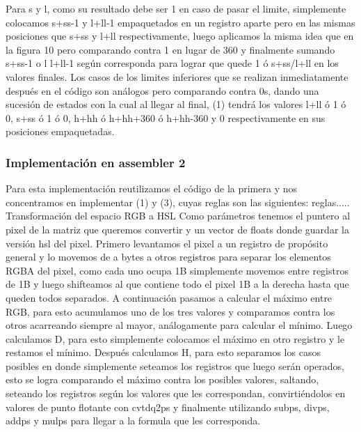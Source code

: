 \documentclass[a4paper]{article}
\begin{document}
Para s y l, como su resultado debe ser 1 en caso de pasar el limite, simplemente colocamos s+ss-1 y l+ll-1 empaquetados en un registro aparte pero en las mismas posiciones que s+ss y l+ll respectivamente, luego aplicamos la misma idea que en la figura 10 pero comparando contra 1 en lugar de 360 y finalmente sumando s+ss-1 o l l+ll-1 según corresponda para lograr que quede 1 ó s+ss/l+ll en los valores finales. Los casos de los limites inferiores que se realizan inmediatamente después en el código son análogos pero comparando contra 0s, dando una sucesión de estados con la cual al llegar al final, (1) tendrá los valores l+ll ó 1 ó 0, s+ss ó 1 ó 0,  h+hh ó h+hh+360 ó h+hh-360 y 0 respectivamente en sus posiciones empaquetadas.

\subsubsection{Implementación en assembler 2}
Para esta implementación reutilizamos el código de la primera y nos concentramos en implementar (1) y (3), cuyas reglas son las siguientes:
\newline\newline
reglas.....
\newline\newline
Transformación del espacio RGB a HSL
\newline\newline
Como parámetros tenemos el puntero al pixel de la matriz que queremos convertir y un vector de floats donde guardar la versión hsl del pixel.
Primero levantamos el pixel a un registro de propósito general y lo movemos de a bytes a otros registros para separar los elementos RGBA del pixel, como cada uno ocupa 1B  simplemente movemos entre registros de 1B y luego shifteamos al que contiene todo el pixel 1B a la derecha hasta que queden todos separados.
\newline
A continuación pasamos a calcular el máximo entre RGB, para esto acumulamos uno de los tres valores y comparamos contra los otros acarreando siempre al mayor, análogamente para calcular el mínimo.
\newline
Luego calculamos D, para esto simplemente colocamos el máximo en otro registro y le restamos el mínimo.
\newline
Después calculamos H, para esto separamos los casos posibles en donde simplemente seteamos los registros que luego serán operados, esto se logra comparando el máximo contra los posibles valores, saltando, seteando los registros según los valores que les correspondan, convirtiéndolos en valores de punto flotante con cvtdq2ps y finalmente utilizando subps, divps, addps y mulps para llegar a la formula que les corresponda.
\newline
\end{document}
